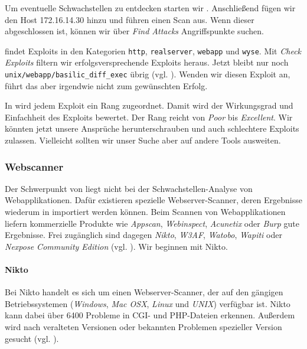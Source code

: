 Um eventuelle Schwachstellen zu entdecken starten wir \Armitage{}. Anschließend fügen wir den Host 172.16.14.30 hinzu und führen einen Scan aus. Wenn dieser abgeschlossen ist, können wir über \emph{\glqq{}Find Attacks\grqq{}} Angriffspunkte suchen.

\Armitage{} findet Exploits in den Kategorien \texttt{http}, \texttt{realserver}, \texttt{webapp} und \texttt{wyse}. Mit \emph{\glqq{}Check Exploits\grqq{}} filtern wir erfolgsversprechende Exploits heraus. Jetzt bleibt nur noch \texttt{unix/webapp/basilic\_diff\_exec} übrig (vgl. ). Wenden wir diesen Exploit an, führt das aber irgendwie nicht zum gewünschten Erfolg.


In \Metasploit{} wird jedem Exploit ein Rang zugeordnet. Damit wird der Wirkungsgrad und Einfachheit des Exploits bewertet. Der Rang reicht von \emph{Poor} bis \emph{Excellent}. Wir könnten jetzt unsere Ansprüche herunterschrauben und auch schlechtere Exploits zulassen. Vielleicht sollten wir unser Suche aber auf andere Tools ausweiten.


\subsubsection{Webscanner}

Der Schwerpunkt von \Metasploit{} liegt nicht bei der Schwachstellen-Analyse von Webapplikationen. Dafür existieren spezielle Webserver-Scanner, deren Ergebnisse wiederum in \Metasploit{} importiert werden können. Beim Scannen von Webapplikationen liefern kommerzielle Produkte wie \emph{Appscan}, \emph{Webinspect}, \emph{Acunetix} oder \emph{Burp} gute Ergebnisse. Frei zugänglich sind dagegen \emph{Nikto}, \emph{W3AF}, \emph{Watobo}, \emph{Wapiti} oder \emph{Nexpose Community Edition} (vgl. \cite[S.~281]{metahandbuch}). Wir beginnen mit Nikto.

\paragraph{Nikto}

Bei Nikto handelt es sich um einen Webserver-Scanner, der auf den gängigen Betriebssystemen (\emph{Windows}, \emph{Mac OSX}, \emph{Linux} und \emph{UNIX}) verfügbar ist. Nikto kann dabei über 6400 Probleme in CGI- und PHP-Dateien erkennen. Außerdem wird nach veralteten Versionen oder bekannten Problemen spezieller Version gesucht (vgl. \cite{Nikto}).

